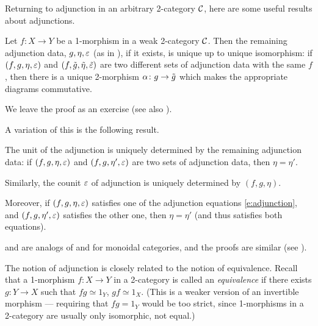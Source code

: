 Returning to adjunction in an arbitrary 2-category $\mathcal{C}$,
here are some useful results about adjunctions.

\begin{lemma}\label{l:adjunction-unique}
  Let $f\colon X\to Y$ be a 1-morphism in a weak 2-category $\mathcal{C}$. Then
  the remaining adjunction data, $g, \eta, \varepsilon$ \textup{(}as in
  \textup{)}, if it exists, is unique up to unique isomorphism: if
  $(f,g,\eta,\varepsilon)$ and $(f, \tilde g, \tilde \eta, \tilde {\varepsilon})$ are two
  different sets of adjunction data with the same $f$, then there is a
  unique 2-morphism $\alpha\colon g\to \tilde g$ which makes the appropriate
  diagrams commutative.
\end{lemma}
We leave the proof as an exercise (see also \cite[Section IV.1]{mac-lane}).

A variation of this is the following result.
\begin{lemma}\label{l:adjunction-unique2}
  The unit of the adjunction is uniquely determined by the remaining
  adjunction data: if $(f, g, \eta, \varepsilon)$ and $(f, g, \eta', \varepsilon)$ are two
  sets of adjunction data, then
  $\eta=\eta'$.

  Similarly, the counit $\varepsilon$ of adjunction is uniquely determined by
  $(f,g, \eta)$.

  Moreover, if $(f, g, \eta, \varepsilon)$ satisfies one of the adjunction equations
  \eqref{e:adjunction}, and $(f, g, \eta', \varepsilon)$ satisfies the other one,
  then $\eta=\eta'$ \textup{(}and thus satisfies both equations\textup{)}.
\end{lemma}
 and  are analogs of
 and  for monoidal categories,
and the proofs are similar (see \cite[Lemma 2.3.8]{lurie-cobordism}).



The notion of adjunction is closely related to the notion of equivalence. Recall
that a 1-morphism $f\colon X\to Y$ in a 2-category is called an
\emph{equivalence} if there exists $g\colon
Y\to X$ such that $fg\simeq 1_Y$, $gf\simeq 1_X$. (This is a weaker version of
an invertible morphism --- requiring that $fg=1_Y$ would be too strict, since
1-morphisms in a 2-category are usually only isomorphic, not equal.)

